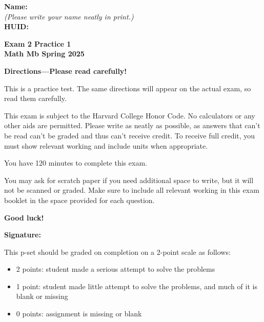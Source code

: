 \documentclass{article}
\begin{document}
 
 
{\large \mbox{} \hfill \bf Name:\underline{\hspace{3in}}}\\[2pt]
{\mbox{} \hfill \it (Please write your name neatly in print.)}\\[12pt]
{\large \mbox{} \hfill \bf HUID:\underline{\hspace{3in}}}
 
\medskip
 
\noindent
{\large\bf
Exam 2 Practice 1\\
Math Mb Spring 2025}
\noindent


{\Large
\begin{center}\textbf{Directions---Please read carefully!} \end{center}}

This is a practice test. The same directions will appear on the actual exam, so read them carefully.

\hrulefill 


This exam is subject to the Harvard College Honor Code. No calculators or any other aids are permitted.  Please write as neatly as possible, as answers that can't be read can't be graded and thus can't receive credit. To receive full credit, you must show relevant working
and include units when appropriate. 

You have 120 minutes to complete this exam. 

You may ask for scratch paper if you need additional space to write, but it will not be scanned or graded. Make sure to include all relevant working in this exam booklet in the space provided for each question.

\begin{center}\textbf{Good luck!}\end{center}


\vfill

\vspace{0.3in}

{\large \mbox{} \hfill \bf Signature:\underline{\hspace{3in}}}
\thispagestyle{empty}

\newpage


\begin{grading}
This p-set should be graded on completion on a 2-point scale as follows:

\begin{itemize}
\item 2 points: student made a serious attempt to solve the problems
\item 1 point: student made little attempt to solve the problems, and much of it is blank or missing
\item 0 points: assignment is missing or blank
\end{itemize}
\end{grading}
\end{document}
